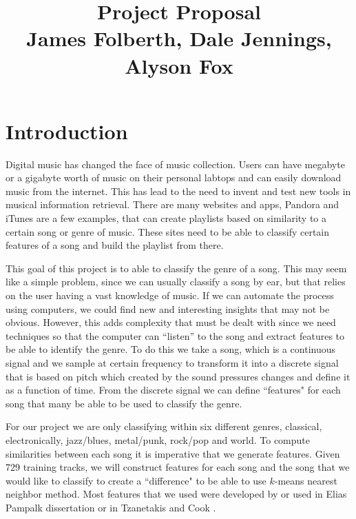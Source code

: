 \documentclass[12pt]{article}
\begin{document}
                                       
\title{Project Proposal\\
James Folberth, Dale Jennings, Alyson Fox}
\maketitle
\section{Introduction}
\indent Digital music has changed the face of music collection. Users can have megabyte or a gigabyte worth of music on their personal labtops and can easily download music from the internet. This has lead to the need to invent and test new tools in musical information retrieval. There are many websites and apps, Pandora and iTunes are a few examples, that can create playlists based on similarity to a certain song or genre of music. These sites need to be able to classify certain features of a song and build the playlist from there. 

\indent This goal of this project is to able to classify the genre of a song. This may seem like a simple problem, since we can usually classify a song by ear, but that relies on the user having a vast knowledge of music. If we can automate the process using computers, we could find new and interesting insights that may not be obvious. However, this adds complexity that must be dealt with since we need techniques so that  the computer can ``listen'' to the song and extract features to be able to identify the genre. To do this we take  a song, which is a continuous signal and we sample at certain frequency to transform it into a discrete signal that is based on pitch which created by the sound pressures changes  and define it as a function of time. From the discrete signal we can define  ``features" for each song that many be able to be used to classify the genre. 

\indent For our project we are only classifying within six different genres, classical, electronically, jazz/blues, metal/punk, rock/pop and world. To compute similarities between each song it is imperative that we generate features. Given 729 training tracks, we will construct features for each song and the song that we would like to classify to create a ``difference" to be able to use $k$-means nearest neighbor method. Most features that we used were developed by or used in Elias Pampalk dissertation \cite{pampalk:dissertation} or in Tzanetakis and Cook \cite{tzanetakis:classification}.
\end{document}
